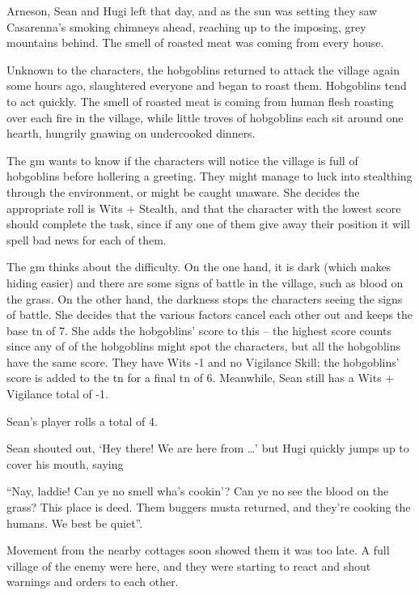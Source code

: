 \begin{exampletext}

  Arneson, Sean and Hugi left that day, and as the sun was setting they saw Casarenna's smoking chimneys ahead, reaching up to the imposing, grey mountains behind.
  The smell of roasted meat was coming from every house.

  Unknown to the characters, the hobgoblins returned to attack the village again some hours ago, slaughtered everyone and began to roast them.
Hobgoblins tend to act quickly.
The smell of roasted meat is coming from human flesh roasting over each fire in the village, while little troves of hobgoblins each sit around one hearth, hungrily gnawing on undercooked dinners.

  The \gls{gm} wants to know if the characters will notice the village is full of hobgoblins before hollering a greeting.
  They might manage to luck into stealthing through the environment, or might be caught unaware.
  She decides the appropriate roll is Wits + Stealth, and that the character with the lowest score should complete the task, since if any one of them give away their position it will spell bad news for each of them.

  The \gls{gm} thinks about the difficulty.
  On the one hand, it is dark (which makes hiding easier) and there are some signs of battle in the village, such as blood on the grass.
  On the other hand, the darkness stops the characters seeing the signs of battle.
  She decides that the various factors cancel each other out and keeps the base \gls{tn} of 7.
  She adds the hobgoblins' score to this -- the highest score counts since any of of the hobgoblins might spot the characters, but all the hobgoblins have the same score.
  They have Wits -1 and no Vigilance Skill; the hobgoblins' score is added to the \gls{tn} for a final \gls{tn} of 6.
  Meanwhile, Sean still has a Wits + Vigilance total of -1.

  Sean's player rolls a total of 4.

  Sean shouted out, `Hey there! We are here from \dots' but Hugi quickly jumps up to cover his mouth, saying

  ``Nay, laddie! Can ye no smell wha's cookin'? Can ye no see the blood on the grass? This place is deed. Them buggers musta returned, and they're cooking the humans. We best be quiet''.

  Movement from the nearby cottages soon showed them it was too late. A full village of the enemy were here, and they were starting to react and shout warnings and orders to each other.

\end{exampletext}

